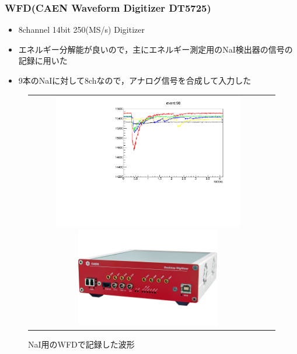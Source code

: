 \subsubsection{WFD(CAEN Waveform Digitizer DT5725)}
  \begin{itemize}
    \item 8channel 14bit 250(MS/s) Digitizer
    \item エネルギー分解能が良いので，主にエネルギー測定用のNaI検出器の信号の記録に用いた
    \item 9本のNaIに対して8chなので，アナログ信号を合成して入力した
  \end{itemize}
  \begin{figure}[H]
    \begin{tabular}{cc}
      \begin{minipage}{0.5\hsize}
        \centering
        \includegraphics[width=0.8\textwidth,angle=-90]{figure/hayakawa/NaI_plot.pdf}
        \caption{NaI用のWFDで記録した波形}
      \end{minipage}
      \begin{minipage}{0.4\hsize}
        \centering
        \includegraphics[width=0.6\textwidth]{figure/hayakawa/DT5725_L.png}
      \end{minipage}
    \end{tabular}
  \end{figure}




%
